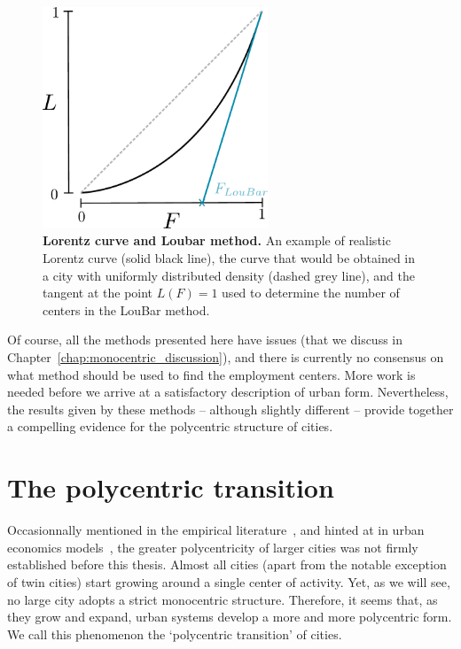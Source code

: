 \begin{figure}
    \centering
    \includegraphics[width=0.6\textwidth]{gfx/chapter-monocentric/loubar.pdf}
    \caption{{\bf Lorentz curve and Loubar method.} An example of realistic Lorentz curve (solid black line), the curve
    that would be obtained in a city with uniformly distributed density (dashed
grey line), and the tangent at the point $L(F) = 1$ used to determine the number
of centers in the LouBar method.\label{fig:loubar}}
\end{figure}

Of course, all the methods presented here have issues (that we discuss 
in Chapter~\ref{chap:monocentric_discussion}), and there is currently no
consensus on what method should be used to find the employment centers.
More work is needed before we arrive at a satisfactory description of
urban form. Nevertheless, the results given by these methods -- although slightly
different -- provide together a compelling evidence for the polycentric
structure of cities. 


\section{The polycentric transition}
\label{sec:the_polycentric_transition}

Occasionnally mentioned in the empirical literature~\cite{McMillen:2003,
Redfearn:2007}, and hinted at in urban economics models~\cite{Fujita:1982},
the greater polycentricity of larger cities was not firmly established before
this thesis. Almost all cities (apart from the notable exception of twin cities)
start growing around a single center of activity. Yet, as we will see, no large
city adopts a strict monocentric structure. Therefore, it seems that, as
they grow and expand, urban systems develop a more and more polycentric form. We
call this phenomenon the `polycentric transition' of cities. 

